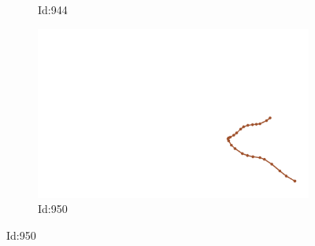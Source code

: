 \documentclass[12pt,twoside]{report}
\begin{document}
\begin{figure}
\begin{subfigure}[b]{0.20\textwidth}
\caption{Id:944}
\end{subfigure}
\begin{subfigure}[b]{0.20\textwidth}
\centering
\includegraphics[width=\textwidth]{../../trajectories/950.png}
\caption{Id:950}
\end{subfigure}
\end{figure}
\end{document}
